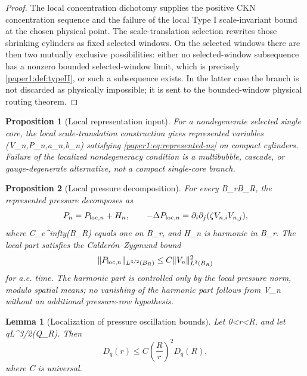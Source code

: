 \documentclass[11pt]{amsart}
\def\({}%
\def\){}%
\def\infty{infty}%
\theoremstyle{plain}
\newtheorem{lemma}[lemma]{Lemma}
\newtheorem{proposition}[proposition]{Proposition}
\theoremstyle{definition}
\theoremstyle{remark}
\begin{document}
\begin{proof}
The local concentration dichotomy supplies the positive CKN concentration
sequence and the failure of the local Type I scale-invariant bound at the
chosen physical point.  The scale-translation selection rewrites those
shrinking cylinders as fixed selected windows.  On the selected windows there
are then two mutually exclusive possibilities: either no selected-window
subsequence has a nonzero bounded selected-window limit, which is precisely
\cref{paper1:def:typeII}, or such a subsequence exists.  In the latter case the
branch is not discarded as physically impossible; it is sent to the
bounded-window physical routing theorem.
\end{proof}

\begin{proposition}[Local representation input]\label{paper1:prop:representation-input}
For a nondegenerate selected single core, the local scale-translation
construction gives represented variables \((V_n,P_n,a_n,b_n)\) satisfying
\eqref{paper1:eq:represented-ns} on compact cylinders.  Failure of the localized
nondegeneracy condition is a multibubble, cascade, or gauge-degenerate
alternative, not a compact single-core branch.
\end{proposition}

\begin{proposition}[Local pressure decomposition]
\label{paper1:prop:pressure-reconstruction}
For every \(B_r\Subset B_R\), the represented pressure decomposes as
\[
  P_n=P_{{\rm loc},n}+H_n,
  \qquad
  -\Delta P_{{\rm loc},n}=\partial_i\partial_j(\zeta V_{n,i}V_{n,j}),
\]
where \(\zeta\in C_c^\infty(B_R)\) equals one on \(B_r\), and \(H_n\) is
harmonic in \(B_r\).  The local part satisfies the Calder\'on--Zygmund bound
\cite{CalderonZygmund1952,Stein1970}
\[
  \|P_{{\rm loc},n}\|_{L^{3/2}(B_R)}
  \le C\|V_n\|_{L^3(B_R)}^2
\]
for a.e. time. The harmonic part is controlled only by the local pressure norm,
modulo spatial means; no vanishing of the harmonic part follows from
\(V_n\) without an additional pressure-row hypothesis.
\end{proposition}

\begin{lemma}[Localization of pressure oscillation bounds]\label{paper1:lem:D-localization}
Let \(0<r<R\), and let \(q\in L^{3/2}(Q_R)\).  Then
\[
  D_q(r)\le C\left(\frac{R}{r}\right)^2D_q(R),
\]
where \(C\) is universal.
\end{lemma}
\end{document}
